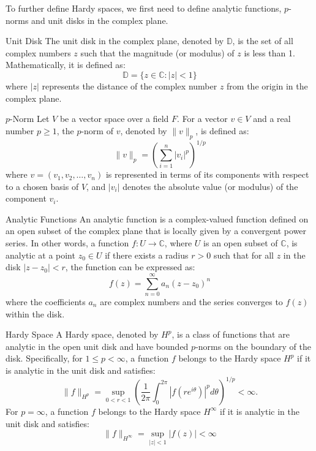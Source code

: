 \documentclass[openany]{book}
\begin{document}
To further define Hardy spaces, we first need to define analytic functions, $p$-norms and unit disks in the complex plane.
\begin{mydefinition}{Unit Disk}
The unit disk in the complex plane, denoted by $\mathbb{D}$, is the set of all complex numbers $z$ such that the magnitude (or modulus) of $z$ is less than 1. Mathematically, it is defined as:
\[\mathbb{D} = \{ z \in \mathbb{C} : |z| < 1 \}\]
where $|z|$ represents the distance of the complex number $z$ from the origin in the complex plane.
\end{mydefinition}
\begin{mydefinition}{$p$-Norm}
Let $V$ be a vector space over a field $F$. For a vector $v \in V$ and a real number $p \geq 1$, the $p$-norm of $v$, denoted by $\|v\|_p$, is defined as:
\[\|v\|_p = \left( \sum_{i=1}^{n} |v_i|^p \right)^{1/p}\]
where $v = (v_1, v_2, \ldots, v_n)$ is represented in terms of its components with respect to a chosen basis of $V$, and $|v_i|$ denotes the absolute value (or modulus) of the component $v_i$.
\end{mydefinition}
\begin{mydefinition}{Analytic Functions}
An analytic function is a complex-valued function defined on an open subset of the complex plane that is locally given by a convergent power series. In other words, a function $f: U \to \mathbb{C}$, where $U$ is an open subset of $\mathbb{C}$, is analytic at a point $z_0 \in U$ if there exists a radius $r > 0$ such that for all $z$ in the disk $|z - z_0| < r$, the function can be expressed as:
\[f(z) = \sum_{n=0}^{\infty} a_n (z - z_0)^n\]
where the coefficients $a_n$ are complex numbers and the series converges to $f(z)$ within the disk.
\end{mydefinition}
\begin{mydefinition}{Hardy Space}
A Hardy space, denoted by $H^p$, is a class of functions that are analytic in the open unit disk and have bounded $p$-norms on the boundary of the disk. Specifically, for $1 \leq p < \infty$, a function $f$ belongs to the Hardy space $H^p$ if it is analytic in the unit disk and satisfies:
\[\|f\|_{H^p} = \sup_{0 < r < 1} \left( \frac{1}{2\pi} \int_0^{2\pi} |f(re^{i\theta})|^p d\theta \right)^{1/p} < \infty.\]
For $p = \infty$, a function $f$ belongs to the Hardy space $H^\infty$ if it is analytic in the unit disk and satisfies:
\[\|f\|_{H^\infty} = \sup_{|z| < 1} |f(z)| < \infty\]
\end{mydefinition}



\end{document}
